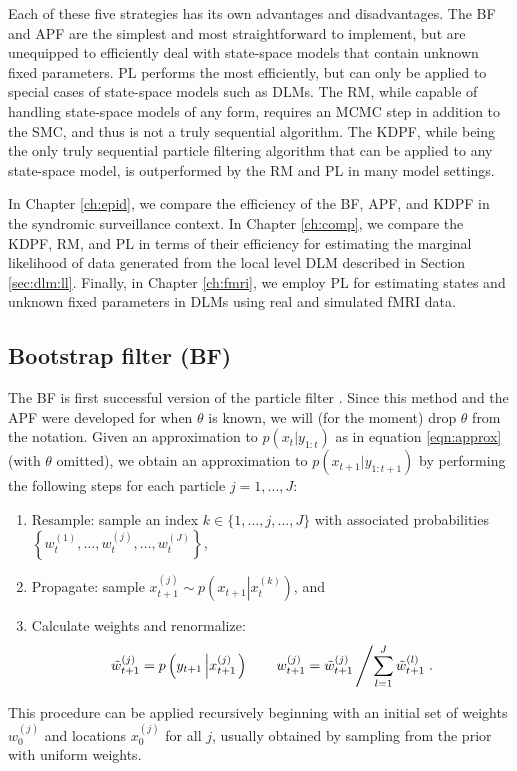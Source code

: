 Each of these five strategies has its own advantages and disadvantages. The BF and APF are the simplest and most straightforward to implement, but are unequipped to efficiently deal with state-space models that contain unknown fixed parameters. PL performs the most efficiently, but can only be applied to special cases of state-space models such as DLMs. The RM, while capable of handling state-space models of any form, requires an MCMC step in addition to the SMC, and thus is not a truly sequential algorithm. The KDPF, while being the only truly sequential particle filtering algorithm that can be applied to any state-space model, is outperformed by the RM and PL in many model settings.

In Chapter \ref{ch:epid}, we compare the efficiency of the BF, APF, and KDPF in the syndromic surveillance context. In Chapter \ref{ch:comp}, we compare the KDPF, RM, and PL in terms of their efficiency for estimating the marginal likelihood of data generated from the local level DLM described in Section \ref{sec:dlm:ll}. Finally, in Chapter \ref{ch:fmri}, we employ PL for estimating states and unknown fixed parameters in DLMs using real and simulated fMRI data.

\subsection{Bootstrap filter (BF) \label{sec:bf}}

The BF is first successful version of the particle filter \citep{Gord:Salm:Smit:nove:1993,Kita:mont:1996}. Since this method and the APF were developed for when $\theta$ is known, we will (for the moment) drop $\theta$ from the notation. Given an approximation to $p(x_t|y_{1:t})$ as in equation \eqref{eqn:approx} (with $\theta$ omitted), we obtain an approximation to $p(x_{t+1}|y_{1:t+1})$ by performing the following steps for each particle $j=1,\ldots,J$:
\begin{enumerate}
\item Resample: sample an index $k\in\{1,\ldots,j,\ldots,J\}$ with associated probabilities $\left\{w_t^{(1)},\ldots,w_t^{(j)},\ldots,w_t^{(J)}\right\}$,
\item Propagate: sample $x_{t+1}^{(j)} \sim p\left( x_{t+1}\left|x_t^{(k)}\right.\right)$, and
\item Calculate weights and renormalize:
\[ \tilde{w}_{t+1}^{(j)} = p\left(y_{t+1}\left|x_{t+1}^{(j)}\right.\right) \qquad w_{t+1}^{(j)} = \tilde{w}_{t+1}^{(j)}\left/ \sum_{l=1}^J \tilde{w}_{t+1}^{(l)} \right. .\]
\end{enumerate}
This procedure can be applied recursively beginning with an initial set of weights $w_0^{(j)}$ and locations $x_0^{(j)}$ for all $j$, usually obtained by sampling from the prior with uniform weights.

